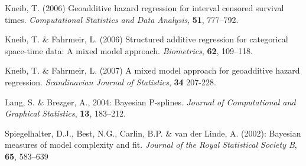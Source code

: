 \documentclass[11pt,a4paper,twoside]{bayesxreport}
\begin{document}
\begin{thebibliography}{99}
  {Kneib, T.} (2006) Geoadditive hazard regression for interval censored
 survival times. {\it Computational Statistics and Data Analysis}, {\bf 51}, 777--792.

  {Kneib, T. \& Fahrmeir, L.} (2006) Structured additive
 regression for categorical space-time data: A mixed model approach. {\it Biometrics}, {\bf 62}, 109--118.

  {Kneib, T. \& Fahrmeir, L.} (2007) A mixed model approach for
 geoadditive hazard regression. {\it Scandinavian Journal of Statistics}, {\bf 34} 207-228.

 Lang, S. \& Brezger, A., 2004: Bayesian P-splines. {\it Journal of Computational
and Graphical Statistics}, {\bf 13}, 183--212.

 Spiegelhalter, D.J., Best, N.G., Carlin, B.P. \& van der Linde, A. (2002):
Bayesian measures of model complexity and fit. {\it Journal of the Royal Statistical Society B}, {\bf 65}, 583--639

\end{thebibliography}
\end{document}
